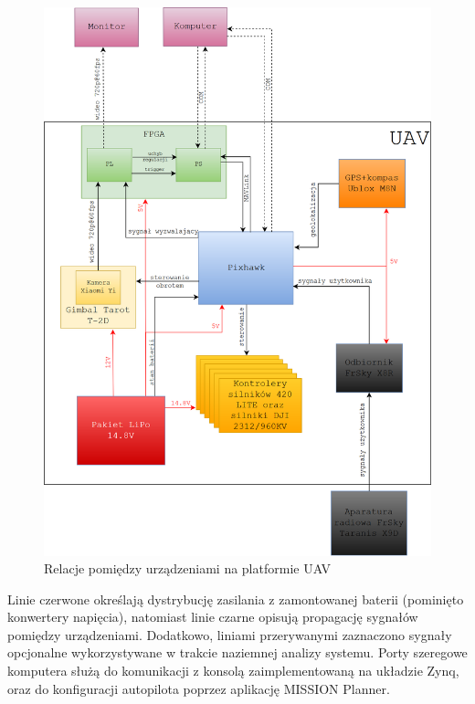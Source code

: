 \begin{figure}[]
	\centering
	\includegraphics[width=15cm]{5_drone_architecture.png}
	\caption{Relacje pomiędzy urządzeniami na platformie UAV}
	\label{fig:architecture}
\end{figure}
Linie czerwone określają dystrybucję zasilania z zamontowanej baterii (pominięto konwertery napięcia), natomiast linie czarne opisują propagację sygnałów pomiędzy urządzeniami. Dodatkowo, liniami przerywanymi zaznaczono sygnały opcjonalne wykorzystywane w trakcie naziemnej analizy systemu. Porty szeregowe komputera służą do komunikacji z konsolą zaimplementowaną na układzie Zynq, oraz do konfiguracji autopilota poprzez aplikację MISSION Planner.






